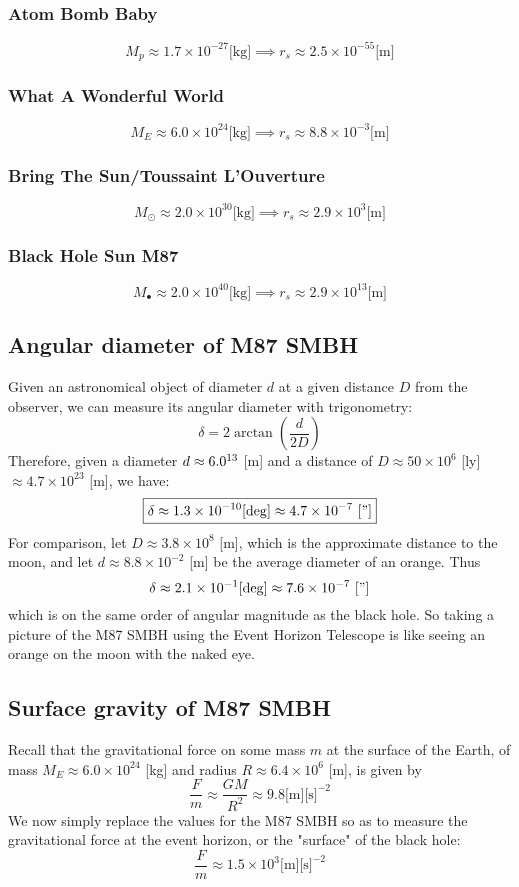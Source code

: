 \documentclass{article}
\begin{document}
	\subsubsection{Atom Bomb Baby}
		$$M_p \approx 1.7 \times 10^{-27} \text{[kg]} \implies \boxed{r_s \approx 2.5 \times 10^{-55} \text{[m]}}$$
	\subsubsection{What A Wonderful World}
		$$M_E \approx 6.0 \times 10^{24} \text{[kg]} \implies \boxed{r_s \approx 8.8 \times 10^{-3} \text{[m]}}$$
	\subsubsection{Bring The Sun/Toussaint L'Ouverture}
		$$M_\odot \approx 2.0 \times 10^{30} \text{[kg]} \implies \boxed{r_s \approx 2.9 \times 10^{3} \text{[m]}}$$
	\subsubsection{Black Hole Sun M87}
		$$M_\bullet \approx 2.0 \times 10^{40} \text{[kg]} \implies \boxed{r_s \approx 2.9 \times 10^{13} \text{[m]}}$$
	\subsection{Angular diameter of M87 SMBH}
		Given an astronomical object of diameter $d$ at a given distance $D$ from the observer, we can measure its angular diameter with trigonometry:
		$$ \delta = 2 \arctan\left(\frac{d}{2D}\right)$$ 
		Therefore, given a diameter $d \approx 6.0 \time 10^{13}$ [m] and a distance of $D \approx 50 \times 10^6$ [ly] $\approx 4.7 \times 10^{23}$ [m], we have:
		$$ \boxed{\delta \approx 1.3 \times 10^{-10} [\deg] \approx 4.7 \times 10^{-7} \,\,["]}$$
		For comparison, let $D \approx 3.8 \times 10^8$ [m], which is the approximate distance to the moon, and let $d \approx 8.8 \times 10^{-2}$ [m] be the average diameter of an orange. Thus
		$$ \delta \approx 2.1 \times 10^{-1} [\deg] \approx 7.6 \times 10^{-7} \,\,["]$$
		which is on the same order of angular magnitude as the black hole. So taking a picture of the M87 SMBH using the Event Horizon Telescope is like seeing an orange on the moon with the naked eye.
	\subsection{Surface gravity of M87 SMBH}
		Recall that the gravitational force on some mass $m$ at the surface of the Earth, of mass $M_E \approx 6.0 \times 10^{24}$ [kg] and radius $R \approx 6.4 \times 10^6$ [m], is given by
		$$ \frac{F}{m} \approx \frac{GM}{R^2} \approx 9.8\text{[m][s]}^{-2}$$
		We now simply replace the values for the M87 SMBH so as to measure the gravitational force at the event horizon, or the "surface" of the black hole:
		$$ \boxed{\frac{F}{m} \approx 1.5 \times 10^3 \text{[m][s]}^{-2}}$$
\end{document}

